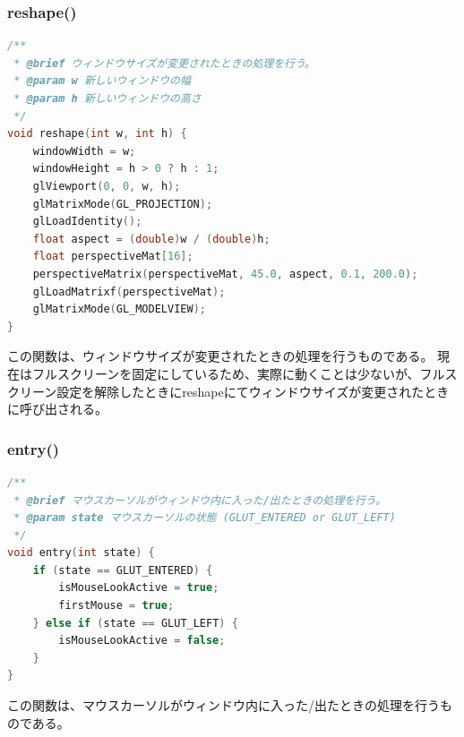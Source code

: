 \documentclass[uplatex,dvipdfmx,a4paper]{jsarticle}
\begin{document}
\hypertarget{func:reshape}{}\subsubsection{reshape()}\label{func:reshape}
\begin{lstlisting}[language=C++, caption={reshape() 関数}, label={lst:reshape_detail}]
/**
 * @brief ウィンドウサイズが変更されたときの処理を行う。
 * @param w 新しいウィンドウの幅
 * @param h 新しいウィンドウの高さ
 */
void reshape(int w, int h) {
    windowWidth = w; 
    windowHeight = h > 0 ? h : 1;
    glViewport(0, 0, w, h);
    glMatrixMode(GL_PROJECTION); 
    glLoadIdentity();
    float aspect = (double)w / (double)h;
    float perspectiveMat[16];
    perspectiveMatrix(perspectiveMat, 45.0, aspect, 0.1, 200.0);
    glLoadMatrixf(perspectiveMat);
    glMatrixMode(GL_MODELVIEW);
}
\end{lstlisting}
この関数は、ウィンドウサイズが変更されたときの処理を行うものである。
現在はフルスクリーンを固定にしているため、実際に動くことは少ないが、フルスクリーン設定を解除したときにreshapeにてウィンドウサイズが変更されたときに呼び出される。

\hypertarget{func:entry}{}\subsubsection{entry()}\label{func:entry}
\begin{lstlisting}[language=C++, caption={entry() 関数}, label={lst:entry_detail}]
/**
 * @brief マウスカーソルがウィンドウ内に入った/出たときの処理を行う。
 * @param state マウスカーソルの状態 (GLUT_ENTERED or GLUT_LEFT)
 */
void entry(int state) {
    if (state == GLUT_ENTERED) {
        isMouseLookActive = true;
        firstMouse = true;
    } else if (state == GLUT_LEFT) {
        isMouseLookActive = false;
    }
}
\end{lstlisting}
この関数は、マウスカーソルがウィンドウ内に入った/出たときの処理を行うものである。
\end{document}
